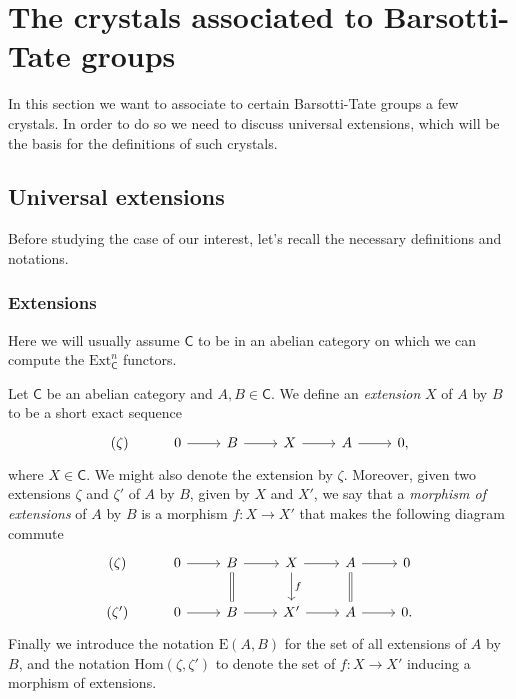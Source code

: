 \section{The crystals associated to Barsotti-Tate groups}
In this section we want to associate to certain Barsotti-Tate groups
a few crystals.
In order to do so we need to discuss universal extensions, which will be the basis
for the definitions of such crystals.



\subsection{Universal extensions}
Before studying the case of our interest, let's recall the necessary definitions
and notations.



\subsubsection{Extensions}
Here we will usually assume $\mathsf{C}$ to be in an abelian category on which
we can compute the $\mathrm{Ext}^n_{\mathsf{C}}$ functors.


\begin{defn}[Extension]
	Let $\mathsf{C}$ be an abelian category and $A,B \in \mathsf{C}$.
	We define an {\em extension} $X$ of $A$ by $B$ to be a short exact sequence
	\begin{equation*}
	\begin{tikzcd}
		(\zeta) &
		0 \arrow[r, "", rightarrow] &
		B \arrow[r, "", rightarrow] &
		X \arrow[r, "", rightarrow] &
		A \arrow[r, "", rightarrow] &
		0
	,\end{tikzcd}
	\end{equation*}
	where $X \in \mathsf{C}$.
	We might also denote the extension by $\zeta$.
	Moreover, given two extensions $\zeta$ and $\zeta'$ of $A$ by $B$,
	given by $X$ and $X'$, we say that a {\em morphism of extensions} of $A$ by $B$
	is a morphism $f\colon X \to X'$ that makes the following diagram commute
	\begin{equation*}
	\begin{tikzcd}
		(\zeta) &
		0 \arrow[r, "", rightarrow] &
		B \arrow[r, "", rightarrow] 
		\arrow[d, "", equals] &
		X \arrow[r, "", rightarrow] 
		\arrow[d, "f", rightarrow] &
		A \arrow[r, "", rightarrow] 
		\arrow[d, "", equals] &
		0\\
		(\zeta') &
		0 \arrow[r, "", rightarrow] &
		B \arrow[r, "", rightarrow] &
		X' \arrow[r, "", rightarrow] &
		A \arrow[r, "", rightarrow] &
		0
	.\end{tikzcd}
	\end{equation*}
	Finally we introduce the notation $\mathrm{E}(A,B)$ for the set of all extensions
	of $A$ by $B$, and the notation $\mathrm{Hom} \left( \zeta, \zeta' \right)$
	to denote the set of $f\colon X \to X'$ inducing a morphism of extensions.
\end{defn}


